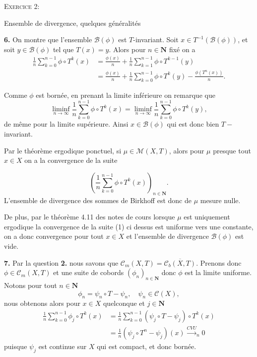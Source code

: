 \documentclass[12pt]{article}
\newenvironment{ex}[1]
{\begin{mdframed}[linewidth=0.6pt]
        \textsc{Exercice #1:}

}
    {\end{mdframed}}
\newcommand{\N}{\mathbf{N}}
\begin{document}
\begin{ex}{2}
       Ensemble de divergence, quelques généralités 
\end{ex}

\textbf{6.} On montre que l'ensemble $\mathcal{B}(\phi)$ est $T$-invariant. Soit $x \in T^{-1}(\mathcal{B}(\phi))$, et soit $y \in \mathcal{B}(\phi)$ tel que $T(x) = y$. Alors pour $n \in \N$ fixé on a 
\begin{align*}
        \frac{1}{n}\sum_{k=0}^{n-1} \phi\circ T^{k}(x) &= \frac{\phi(x)}{n} + \frac{1}{n}\sum_{k=1}^{n-1} \phi\circ T^{k-1}(y) \\
                                                       &=\frac{\phi(x)}{n} + \frac{1}{n}\sum_{k=0}^{n-1} \phi\circ T^{k}(y) - \frac{\phi(T^{n}(x))}{n}
.\end{align*}

Comme $\phi$ est bornée, en prenant la limite inférieure on remarque que \[
        \liminf_{n\to \infty} \frac{1}{n}\sum_{k=0}^{n-1} \phi\circ T^{k}(x) = \liminf_{n\to \infty} \frac{1}{n}\sum_{k=0}^{n-1} \phi\circ T^{k}(y)
,\] de même pour la limite supérieure. Ainsi $x \in \mathcal{B}(\phi)$ qui est donc bien $T-$invariant. 

\medskip

Par le théorème ergodique ponctuel, si $\mu \in \mathcal{M}(X,T)$, alors pour $\mu$ presque tout  $x \in X$ on a la convergence de la suite 

\begin{equation}
        (\frac{1}{n}\sum_{k=0}^{n-1} \phi\circ T^{k}(x))_{n\in\N}.
\end{equation}
L'ensemble de divergence des sommes de Birkhoff est donc de $\mu$ mesure nulle. 

\medskip

De plus, par le théorème 4.11 des notes de cours lorsque $\mu$ est uniquement ergodique la convergence de la suite (1) ci dessus est uniforme vers une constante, on a donc convergence pour tout  $x \in X$ et l'ensemble de divergence $\mathcal{B}(\phi)$ est vide.

\bigskip

\textbf{7.} Par la question \textbf{2.} nous savons que $\mathcal{C}_{m}(X,T) = \overline{\mathcal{C}_{b}(X,T)}$. Prenons donc $\phi \in \mathcal{C}_{m}(X,T)$ et une suite de cobords $(\phi_{n})_{n\in\N}$ donc $\phi$ est la limite uniforme. Notons pour tout $n \in \N$ \[
        \phi_{n} = \psi_{n}\circ T - \psi_{n}, \quad \psi_{n} \in \mathcal{C}(X)
,\] nous obtenons alors pour $x \in X$ quelconque et $j\in\N$
\begin{align*}
        \frac{1}{n}\sum_{k=0}^{n-1} \phi_{j}\circ T^{k}(x) &= \frac{1}{n}\sum_{k=0}^{n-1} (\psi_{j}\circ T - \psi_{j})\circ T^{k}(x) \\
                                                            &= \frac{1}{n}(\psi_{j}\circ T^{n}-\psi_{j})(x) \overset{CVU}{\longrightarrow}_{n} 0
\end{align*} puisque $\psi_{j}$ est continue sur $X$ qui est compact, et donc bornée.
\end{document}
